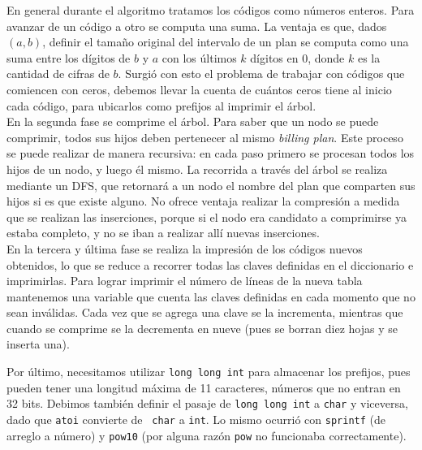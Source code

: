 En general durante el algoritmo tratamos los códigos como números
enteros. Para avanzar de un código a otro se computa una suma. La ventaja es
que, dados $(a,b)$, definir el tamaño original del intervalo de un plan se
computa como una suma entre los dígitos de $b$ y $a$ con los últimos $k$
dígitos en 0, donde $k$ es la cantidad de cifras de $b$. Surgió con esto
el problema de trabajar con códigos que comiencen con ceros, debemos llevar
la cuenta de cuántos ceros tiene al inicio cada código, para ubicarlos
como prefijos al imprimir el árbol.\\

En la segunda fase se comprime el árbol. Para saber que un nodo se puede
comprimir, todos sus hijos deben pertenecer al mismo {\sl billing plan}. Este
proceso se puede realizar de manera recursiva: en cada paso primero se
procesan todos los hijos de un nodo, y luego él mismo. La recorrida a
través del árbol se realiza mediante un DFS, que retornará a un nodo el
nombre del plan que comparten sus hijos si es que existe alguno. No ofrece
ventaja realizar la compresión a medida que se realizan las inserciones,
porque si el nodo era candidato a comprimirse ya estaba completo, y no se
iban a realizar allí nuevas inserciones.\\

En la tercera y última fase se realiza la impresión de los códigos nuevos
obtenidos, lo que se reduce a recorrer todas las claves definidas en el
diccionario e imprimirlas. Para lograr imprimir el número de líneas de
la nueva tabla mantenemos una variable que cuenta las claves definidas en
cada momento que no sean inválidas. Cada vez que se agrega una clave se
la incrementa, mientras que cuando se comprime se la decrementa en nueve
(pues se borran diez hojas y se inserta una).

Por último, necesitamos utilizar {\tt long long int} para almacenar los
prefijos, pues pueden tener una longitud máxima de 11 caracteres, números
que no entran en 32 bits. Debimos también definir el pasaje de {\tt long
long int} a {\tt char} y viceversa, dado que {\tt atoi} convierte de {\tt
char} a {\tt int}. Lo mismo ocurrió con {\tt sprintf} (de arreglo a número)
y {\tt pow10} (por alguna razón {\tt pow} no funcionaba correctamente).



